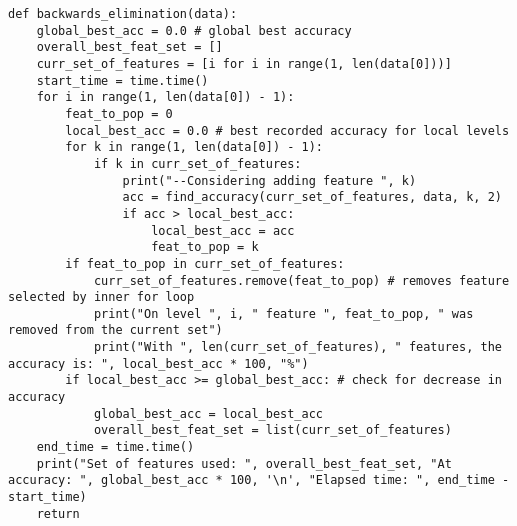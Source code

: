 \documentclass{article}
\begin{document}
\begin{lstlisting}[captionpos=b, caption=Impementation, label=listing:sparql_getallindividuals,
   basicstyle=\ttfamily]
def backwards_elimination(data):
    global_best_acc = 0.0 # global best accuracy
    overall_best_feat_set = []
    curr_set_of_features = [i for i in range(1, len(data[0]))]
    start_time = time.time()
    for i in range(1, len(data[0]) - 1):
        feat_to_pop = 0
        local_best_acc = 0.0 # best recorded accuracy for local levels
        for k in range(1, len(data[0]) - 1):
            if k in curr_set_of_features:
                print("--Considering adding feature ", k)
                acc = find_accuracy(curr_set_of_features, data, k, 2)
                if acc > local_best_acc:
                    local_best_acc = acc
                    feat_to_pop = k
        if feat_to_pop in curr_set_of_features: 
            curr_set_of_features.remove(feat_to_pop) # removes feature selected by inner for loop
            print("On level ", i, " feature ", feat_to_pop, " was removed from the current set")
            print("With ", len(curr_set_of_features), " features, the accuracy is: ", local_best_acc * 100, "%")
        if local_best_acc >= global_best_acc: # check for decrease in accuracy
            global_best_acc = local_best_acc
            overall_best_feat_set = list(curr_set_of_features)
    end_time = time.time()
    print("Set of features used: ", overall_best_feat_set, "At accuracy: ", global_best_acc * 100, '\n', "Elapsed time: ", end_time - start_time)
    return


\end{lstlisting}
\end{document}
